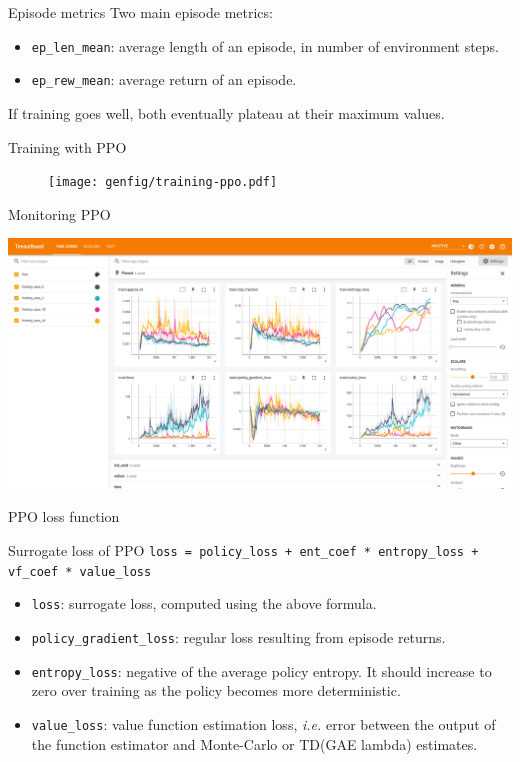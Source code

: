 \documentclass[10pt, aspectratio=1610]{beamer}
\begin{document}
\begin{frame}{Episode metrics}
    Two main episode metrics:
    \begin{itemize}
        \item \texttt{ep_len_mean}: average length of an episode, in number of environment steps.
        \item \texttt{ep_rew_mean}: average return of an episode.
    \end{itemize}
    If training goes well, both eventually plateau at their maximum values.
\end{frame}

\begin{frame}{Training with PPO}
    \begin{figure}
        \texttt{[image: genfig/training-ppo.pdf]}
    \end{figure}
\end{frame}

\begin{frame}{Monitoring PPO}
   \begin{adjustbox}{width=\paperwidth, height=\paperheight, keepaspectratio, center}
        \includegraphics[width=\columnwidth]{figures/tensorboard-ppo.png}
   \end{adjustbox}
\end{frame}

\begin{frame}[fragile]{PPO loss function}
    \begin{block}{Surrogate loss of PPO}
        \texttt{loss = policy_loss + ent_coef * entropy_loss + vf_coef * value_loss}
    \end{block}
    \begin{itemize}
        \item \texttt{loss}: surrogate loss, computed using the above formula.
        \item \texttt{policy_gradient_loss}: regular loss resulting from episode returns.
        \item \texttt{entropy_loss}: negative of the average policy entropy. It should increase to zero over training as the policy becomes more deterministic.
        \item \texttt{value_loss}: value function estimation loss, \emph{i.e.} error between the output of the function estimator and Monte-Carlo or TD(GAE lambda) estimates.
    \end{itemize}
\end{frame}
\end{document}
